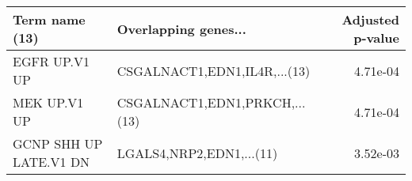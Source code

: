 \begin{tabular}{llr}
\toprule
        Term name (13) &          Overlapping genes... &  Adjusted p-value \\
\midrule
         EGFR UP.V1 UP &  CSGALNACT1,EDN1,IL4R,...(13) &          4.71e-04 \\
          MEK UP.V1 UP & CSGALNACT1,EDN1,PRKCH,...(13) &          4.71e-04 \\
GCNP SHH UP LATE.V1 DN &      LGALS4,NRP2,EDN1,...(11) &          3.52e-03 \\
\bottomrule
\end{tabular}
